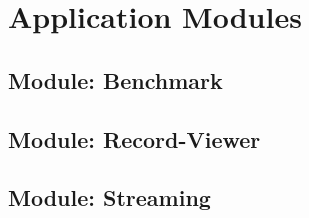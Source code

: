 \chapter{Application Modules}

\section{Module: Benchmark}
\label{sec:benchmark}

\section{Module: Record-Viewer}
\label{sec:recordviewer}

\section{Module: Streaming}
\label{sec:streaming}

